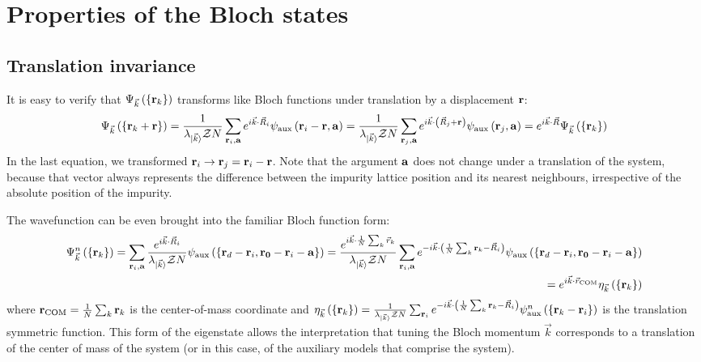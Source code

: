 \documentclass[reprint,hidelinks,onecolumn]{revtex4-2}
\begin{document}
\section{Properties of the Bloch states}\label{BlochProperties}

\subsection{Translation invariance}
It is easy to verify that \(\Psi_{\vec k}\left(\left\{ {\bf r}_k \right\}  \right) \) transforms like Bloch functions under translation by a displacement \({\bf r}\):
\begin{equation}\begin{aligned}
	\Psi_{\vec k}\left(\left\{{\bf r}_k + {\bf r}\right\} \right) = \frac{1}{\lambda_{\ket{\vec k}} \mathcal{Z} N}\sum_{{\bf r}_i,{\bf a}} e^{i \vec{k}\cdot\vec{R}_i} \psi_\text{aux}\left({\bf r}_i - {\bf r}, {\bf a}\right) = \frac{1}{\lambda_{\ket{\vec k}} \mathcal{Z} N}\sum_{{\bf r}_j, {\bf a}} e^{i \vec{k}\cdot\left(\vec{R}_j + {\bf r}\right)} \psi_\text{aux}\left({\bf r}_j, {\bf a}\right) = e^{i \vec{k}\cdot\vec{R}} \Psi_{\vec k}\left(\left\{ {\bf r}_k \right\} \right)
\end{aligned}\end{equation}
In the last equation, we transformed \({\bf r}_i \to {\bf r}_j = {\bf r}_i - {\bf r}\). Note that the argument \({\bf a}\) does not change under a translation of the system, because that vector always represents the difference between the impurity lattice position and its nearest neighbours, irrespective of the absolute position of the impurity.

The wavefunction can be even brought into the familiar Bloch function form:
\begin{equation}\begin{aligned}
	\Psi^n_{\vec k}\left(\left\{{\bf r}_k\right\}\right) = \sum_{{\bf r}_i, {\bf a}} \frac{e^{i \vec{k}\cdot\vec{R}_i}}{\lambda_{\ket{\vec k}} \mathcal{Z} N} \psi_\text{aux}\left(\left\{ {\bf r}_d - {\bf r}_i, {\bf r_0} - {\bf r}_i - {\bf a} \right\} \right) = \frac{e^{i \vec{k}\cdot\frac{1}{N}\sum_k \vec{r}_k}}{\lambda_{\ket{\vec k}} \mathcal{Z} N}\sum_{{\bf r}_i, {\bf a}} e^{-i \vec{k}\cdot\left(\frac{1}{N}\sum_k{\bf r}_k - \vec{R}_i\right)} \psi_\text{aux}\left(\left\{ {\bf r}_d - {\bf r}_i, {\bf r_0} - {\bf r}_i - {\bf a} \right\} \right) \\
	= e^{i \vec{k}\cdot\vec{r}_\text{COM}} \eta_{\vec k}\left(\left\{{\bf r}_k\right\}\right)
\end{aligned}\end{equation}
where \({\bf r}_\text{COM} = \frac{1}{N}\sum_k {\bf r}_k\) is the center-of-mass coordinate and \(\eta_{\vec k}\left(\left\{{\bf r}_k\right\}\right) = \frac{1}{\lambda_{\ket{\vec k}} \mathcal{Z} N}\sum_{{\bf r}_i} e^{-i \vec{k}\cdot\left(\frac{1}{N}\sum_k{\bf r}_k - \vec{R}_i\right)} \psi^n_\text{aux}\left(\left\{{\bf r}_k - {\bf r}_i\right\}\right)\) is the translation symmetric function. This form of the eigenstate allows the interpretation that tuning the Bloch momentum \(\vec k\) corresponds to a translation of the center of mass of the system (or in this case, of the auxiliary models that comprise the system).
\end{document}
